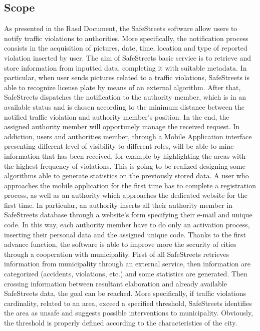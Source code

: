 \documentclass[12pt]{article}
\begin{document}
\subsection{Scope}
\vspace{5mm}
As presented in the Rasd Document, the SafeStreets software allow users to notify traffic violations to authorities. More specifically, the notification process consists in the acquisition of pictures, date, time, location and type of reported violation inserted by user. The aim of SafeStreets basic service is to retrieve and store information from inputted data, completing it with suitable metadata.  In particular, when user sends pictures related to a traffic violations, SafeStreets is able to recognize license plate by means of an external algorithm. After that, SafeStreets dispatches the notification to the authority member, which is in an available status and is chosen according to the minimum distance between the notified traffic violation and authority member’s position. In the end, the assigned authority member will opportunely manage the received request. In addiction, users and authorities member, through a Mobile Application interface presenting different level of visibility to different roles, will be able to mine information that has been received, for example by highlighting the areas with the highest frequency of violations. This is going to be realized designing some algorithms able to generate statistics on the previously stored data. A user who approaches the mobile application for the first time has to complete a registration process, as well as an authority which approaches the dedicated website for the first time. In particular, an authority inserts all their authority member in SafeStreets database through a website’s form specifying their e-mail and unique code. In this way, each authority member have to do only an activation process, inserting their personal data and the assigned unique code.
Thanks to the first advance function, the software is able to improve more the security of cities through a cooperation with municipality. First of all SafeStreets retrieves information from municipality through an external service, then information are categorized (accidents, violations, etc.) and some statistics are generated. Then crossing information between resultant elaboration and already available SafeStreets data, the goal can be reached. More specifically, if traffic violations cardinality, related to an area, exceed a specified threshold, SafeStreets identifies the area as unsafe and suggests possible interventions to municipality. Obviously, the threshold is properly defined according to the characteristics of the city.
\end{document}

